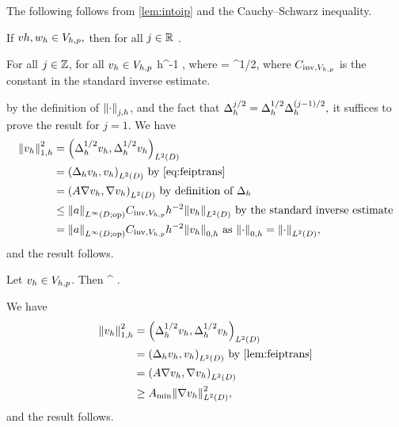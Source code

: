 The following  follows from \cref{lem:intoip} and the Cauchy--Schwarz inequality.

\label{cor:ipdiscbound}
If $vh, w_{h} \in V_{h,p},$ then for all $j \in \mathbb R$
\beqs
\IPLtD{\vh}{\wh} \leq \Njh{\vh}\Nmjh{\wh}.
\eeqs
\eco

\label{lem:inversediscrete}
For all $j \in \mathbb Z$, for all $v_{h} \in V_{h,p}$
\beqs
\Njh{\vh} \leq \Chinv h^{-1} \Njmoh{\vh},
\eeqs
where
\beqs
\Chinv = \CinvVhp {}^{1/2},
\eeqs
where $C_{\mathrm{inv},V_{h,p}}$ is the constant in the standard inverse estimate.
\ele

by the definition of $\Njh{\cdot}$, and the fact that $\Delta_{h}^{j/2} = \Delta_{h}^{1/2}\Delta_{h}^{(j-1)/2},$ it suffices to prove the result for $j=1$. We have
\begin{align*}
\Noh{\vh}^2 &= \IPLtD{\Deltahh \vh}{\Deltahh \vh}\\
&= \IPLtD{\Deltah \vh}{\vh} \text{ by \cref{eq:feiptrans}}\\
&= \IPLtD{A \grad \vh}{\grad \vh} \text{ by definition of } \Deltah\\
&\leq \NLiDop{a} \CinvVhp h^{-2} \NLtD{\vh} \text{ by the standard inverse estimate}\\
&= \NLiDop{a} \CinvVhp h^{-2} \Nzh{\vh} \text{ as } \Nzh{\cdot} = \NLtD{\cdot},
\end{align*}
and the result follows.
\epf

\label{lem:h1contdisc}
Let $v_{h} \in V_{h,p}$. Then
\beqs
\SNHoD{\vh} \leq \Amin^{\half} \Noh{\vh}.
\eeqs
\ele

We have
\begin{align*}
\Noh{\vh}^2 &= \IPLtD{\Deltahh \vh}{\Deltahh \vh}\\
&= \IPLtD{\Deltah \vh}{\vh} \text{ by \cref{lem:feiptrans}}\\
&= \IPLtD{A \grad \vh}{\grad \vh}\\
&\geq \Amin \NLtD{\grad \vh}^2,
\end{align*}
and the result follows.
\epf

